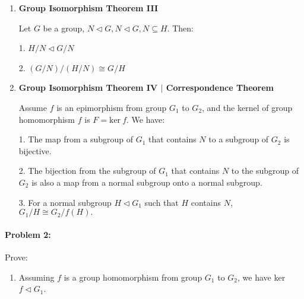 \documentclass[12pt]{scrartcl}
\begin{document}
{{\begin{enumerate}[label=(\alph*)]
\begin{spacing}{1.3}
\setlength{\leftskip}{20pt}1. $HN$ is a subgroup of $G$ which contains $N.$

2. $(H \cap N) \lhd H.$

3. $HN/N \cong H/(H \cap N).$

\end{spacing}


\item \textbf{Group Isomorphism Theorem III}
\begin{spacing}{1.3}
Let $G$ be a group, $N \lhd G, N \lhd G, N \subseteq H$. Then:

\setlength{\leftskip}{20pt}1. $H/N \lhd G/N$

2. $(G/N)/(H/N) \cong G/H$
\end{spacing}


\item \begin{spacing}{1.3}\textbf{Group Isomorphism Theorem IV $|$ Correspondence Theorem}

Assume $f$ is an epimorphism from group $G_1$ to $G_2$, and the kernel of group homomorphism $f$ is $F = \text{ker} ~ f$. We have: 

\setlength{\leftskip}{20pt}1. The map from a subgroup of $G_1$ that contains $N$ to a subgroup of $G_2$ is bijective.

2. The bijection from the subgroup of $G_1$ that contains $N$ to the subgroup of $G_2$ is also a map from a normal subgroup onto a normal subgroup.

3. For a normal subgroup $H \lhd G_1$ such that $H$ contains $N$, $G_1/H \cong G_2/f(H).$
\end{spacing}

\vspace{-0.2em}

	\end{enumerate}


\newpage

\paragraph*{Problem 2: }Prove:

\begin{enumerate}[label=(\alph*)]
	\item Assuming $f$ is a group homomorphism from group $G_1$ to $G_2$, we have ker $f \lhd G_1$.

\vspace{0.5em}
	\begin{spacing}{1.2}
\end{spacing}
\end{enumerate}}}
\end{document}
